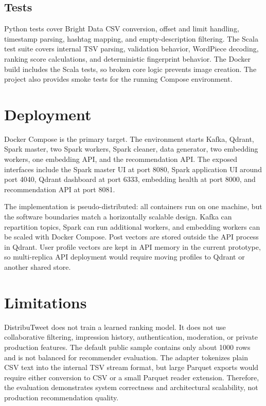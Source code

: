 \documentclass[conference]{IEEEtran}
\begin{document}
\subsection{Tests}
Python tests cover Bright Data CSV conversion, offset and limit handling, timestamp parsing, hashtag mapping, and empty-description filtering. The Scala test suite covers internal TSV parsing, validation behavior, WordPiece decoding, ranking score calculations, and deterministic fingerprint behavior. The Docker build includes the Scala tests, so broken core logic prevents image creation. The project also provides smoke tests for the running Compose environment.

\section{Deployment}
Docker Compose is the primary target. The environment starts Kafka, Qdrant, Spark master, two Spark workers, Spark cleaner, data generator, two embedding workers, one embedding API, and the recommendation API. The exposed interfaces include the Spark master UI at port 8080, Spark application UI around port 4040, Qdrant dashboard at port 6333, embedding health at port 8000, and recommendation API at port 8081.

The implementation is pseudo-distributed: all containers run on one machine, but the software boundaries match a horizontally scalable design. Kafka can repartition topics, Spark can run additional workers, and embedding workers can be scaled with Docker Compose. Post vectors are stored outside the API process in Qdrant. User profile vectors are kept in API memory in the current prototype, so multi-replica API deployment would require moving profiles to Qdrant or another shared store.

\section{Limitations}
DistribuTweet does not train a learned ranking model. It does not use collaborative filtering, impression history, authentication, moderation, or private production features. The default public sample contains only about 1000 rows and is not balanced for recommender evaluation. The adapter tokenizes plain CSV text into the internal TSV stream format, but large Parquet exports would require either conversion to CSV or a small Parquet reader extension. Therefore, the evaluation demonstrates system correctness and architectural scalability, not production recommendation quality.
\end{document}
